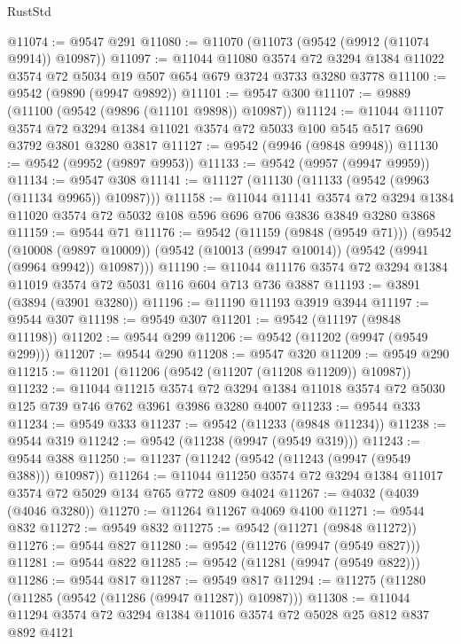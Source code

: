 \begin{lexlean}{RustStd}
\begin{coremodule}
@11074 := @9547 @291
@11080 := @11070 (@11073 (@9542 (@9912 (@11074 @9914)) @10987))
@11097 := @11044
    @11080
    @3574
    @72
    @3294
    @1384
    @11022
    @3574
    @72
    @5034
    @19
    @507
    @654
    @679
    @3724
    @3733
    @3280
    @3778
@11100 := @9542 (@9890 (@9947 @9892))
@11101 := @9547 @300
@11107 := @9889 (@11100 (@9542 (@9896 (@11101 @9898)) @10987))
@11124 := @11044
    @11107
    @3574
    @72
    @3294
    @1384
    @11021
    @3574
    @72
    @5033
    @100
    @545
    @517
    @690
    @3792
    @3801
    @3280
    @3817
@11127 := @9542 (@9946 (@9848 @9948))
@11130 := @9542 (@9952 (@9897 @9953))
@11133 := @9542 (@9957 (@9947 @9959))
@11134 := @9547 @308
@11141 := @11127 (@11130 (@11133 (@9542 (@9963 (@11134 @9965)) @10987)))
@11158 := @11044
    @11141
    @3574
    @72
    @3294
    @1384
    @11020
    @3574
    @72
    @5032
    @108
    @596
    @696
    @706
    @3836
    @3849
    @3280
    @3868
@11159 := @9544 @71
@11176 := @9542
    (@11159 (@9848 (@9549 @71)))
    (@9542
      (@10008 (@9897 @10009))
      (@9542 (@10013 (@9947 @10014)) (@9542 (@9941 (@9964 @9942)) @10987)))
@11190 := @11044 @11176 @3574 @72 @3294 @1384 @11019 @3574 @72 @5031 @116 @604 @713 @736 @3887
@11193 := @3891 (@3894 (@3901 @3280))
@11196 := @11190 @11193 @3919 @3944
@11197 := @9544 @307
@11198 := @9549 @307
@11201 := @9542 (@11197 (@9848 @11198))
@11202 := @9544 @299
@11206 := @9542 (@11202 (@9947 (@9549 @299)))
@11207 := @9544 @290
@11208 := @9547 @320
@11209 := @9549 @290
@11215 := @11201 (@11206 (@9542 (@11207 (@11208 @11209)) @10987))
@11232 := @11044
    @11215
    @3574
    @72
    @3294
    @1384
    @11018
    @3574
    @72
    @5030
    @125
    @739
    @746
    @762
    @3961
    @3986
    @3280
    @4007
@11233 := @9544 @333
@11234 := @9549 @333
@11237 := @9542 (@11233 (@9848 @11234))
@11238 := @9544 @319
@11242 := @9542 (@11238 (@9947 (@9549 @319)))
@11243 := @9544 @388
@11250 := @11237 (@11242 (@9542 (@11243 (@9947 (@9549 @388))) @10987))
@11264 := @11044 @11250 @3574 @72 @3294 @1384 @11017 @3574 @72 @5029 @134 @765 @772 @809 @4024
@11267 := @4032 (@4039 (@4046 @3280))
@11270 := @11264 @11267 @4069 @4100
@11271 := @9544 @832
@11272 := @9549 @832
@11275 := @9542 (@11271 (@9848 @11272))
@11276 := @9544 @827
@11280 := @9542 (@11276 (@9947 (@9549 @827)))
@11281 := @9544 @822
@11285 := @9542 (@11281 (@9947 (@9549 @822)))
@11286 := @9544 @817
@11287 := @9549 @817
@11294 := @11275 (@11280 (@11285 (@9542 (@11286 (@9947 @11287)) @10987)))
@11308 := @11044 @11294 @3574 @72 @3294 @1384 @11016 @3574 @72 @5028 @25 @812 @837 @892 @4121

\end{coremodule}
\end{lexlean}
